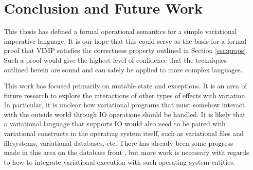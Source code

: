 \documentclass[12pt,oneside]{book}
\begin{document}
\chapter{Conclusion and Future Work}
\label{ch:conc}

This thesis has defined a formal operational semantics for a simple variational imperative language. It is our hope that
this could serve as the basis for a formal proof that VIMP satisfies the correctness property outlined in Section \ref{sec:props}.
Such a proof would give the highest level of confidence that the techniques outlined herein are sound and can safely be
applied to more complex languages.

This work has focused primarily on mutable state and exceptions. It is an area of future research to explore the interactions
of other types of effects with variation. In particular, it is unclear how variational programs that must somehow interact with
the outside world through IO operations should be handled. It is likely that a variational language that supports IO would also
need to be paired with variational constructs in the operating system itself, such as variational files and filesystems, variational
databases, etc. There has already been some progress made in this area on the database front \cite{ataei2017variational,vldb}, but more work is necessary
with regards to how to integrate variational execution with such operating system entities.


\cleardoublepage



\clearpage\flyleaf
\end{document}
